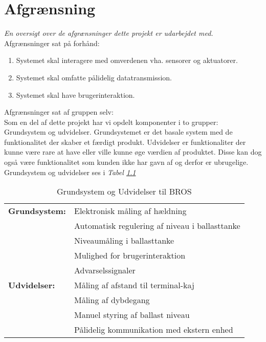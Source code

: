 \chapter{Afgrænsning}
\textit{En oversigt over de afgrænsninger dette projekt er udarbejdet med.}\\
Afgrænsninger sat på forhånd:\\
\begin{enumerate}[a]
\item Systemet skal interagere med omverdenen vha. sensorer og aktuatorer.
\item Systemet skal omfatte pålidelig datatransmission.
\item Systemet skal have brugerinteraktion.
\end{enumerate}
Afgrænsninger sat af gruppen selv:\\
Som en del af dette projekt har vi opdelt komponenter i to grupper: Grundsystem og udvidelser. Grundsystemet er det basale system med de funktionalitet der skaber et færdigt produkt. Udvidelser er funktionaliter der kunne være rare at have eller ville kunne øge værdien af produktet. Disse kan dog også være funktionalitet som kunden ikke har gavn af og derfor er ubrugelige. Grundsystem og udvidelser ses i \textit{Tabel \ref{tabel:Grundogudvid} }
\begin{table}[H]
\centering
\begin{tabular}{|l|l|}
\hline
\textbf{Grundsystem:} &Elektronisk måling af hældning\\
 &Automatisk regulering af niveau i ballasttanke\\
 &Niveaumåling i ballasttanke\\
 &Mulighed for brugerinteraktion\\
 &Advarselssignaler\\\hline
\textbf{Udvidelser:} &Måling af afstand til terminal-kaj\\
 &Måling af dybdegang\\
 &Manuel styring af ballast niveau\\
 &Pålidelig kommunikation med ekstern enhed\\\hline
\end{tabular}
\caption{Grundsystem og Udvidelser til BROS}
\label{tabel:Grundogudvid}
\end{table}